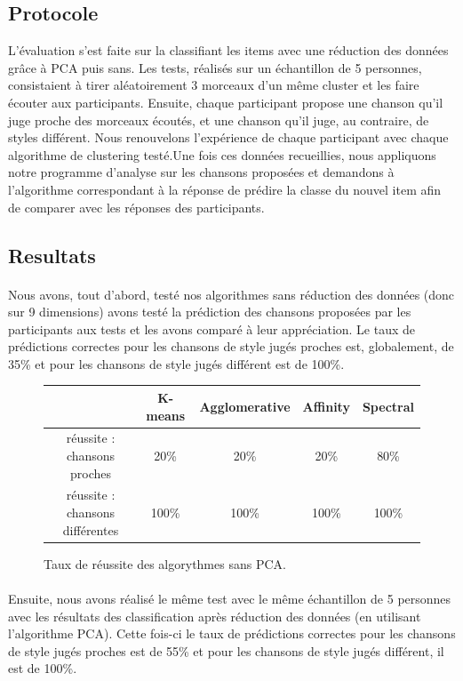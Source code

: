 \documentclass[soumission]{ir}
\begin{document}
\subsection{Protocole}
L’évaluation s’est faite sur la classifiant les items avec une réduction des données grâce à PCA puis sans. Les 
tests, réalisés sur un échantillon de 5 personnes, consistaient à tirer aléatoirement 3 morceaux d’un même 
cluster et les faire écouter aux participants. Ensuite, chaque participant propose une chanson qu’il juge proche 
des morceaux écoutés, et une chanson qu’il juge, au contraire, de styles différent. Nous renouvelons l’expérience 
de chaque participant avec chaque algorithme de clustering testé.Une fois ces données recueillies, nous 
appliquons notre programme d’analyse sur les chansons proposées et demandons à l’algorithme correspondant à la 
réponse de prédire la classe du nouvel item afin de comparer avec les réponses des participants.

\subsection{Resultats}
\paragraph{}
Nous avons, tout d’abord, testé nos algorithmes sans réduction des données (donc sur 9 dimensions) avons testé 
la prédiction des chansons proposées par les participants aux tests et les avons comparé à leur appréciation. Le 
taux de prédictions correctes pour les chansons de style jugés proches est, globalement, de 35\% et pour les 
chansons de style jugés différent est de 100\%.


\begin{figure}[ht]
    \centering
    \begin{tabular}{ccccc}
        \phantom & K-means & Agglomerative & Affinity & Spectral\\
        \hline
        réussite : chansons proches & 20\%& 20\% & 20\% & 80\%\\
        réussite : chansons différentes & 100\% & 100\% & 100\% & 100\%\\
        \hline
    \end{tabular}
    \caption{Taux de réussite des algorythmes sans PCA.}
\end{figure}

\paragraph{}
Ensuite, nous avons réalisé le même test avec le même échantillon de 5 personnes avec les résultats des 
classification après réduction des données (en utilisant l’algorithme PCA). Cette fois-ci le taux de prédictions 
correctes pour les chansons de style jugés proches est de 55\% et pour les chansons de style jugés différent, il 
est de 100\%.
\end{document}
